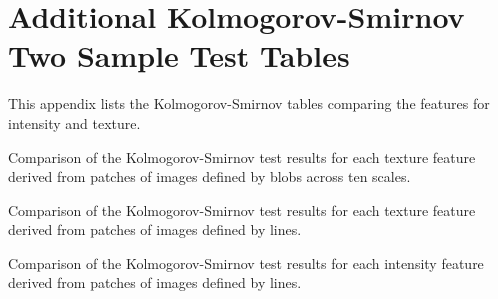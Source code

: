 \chapter{Additional Kolmogorov-Smirnov Two Sample Test Tables}
\label{appendix:ks-test}
This appendix lists the Kolmogorov-Smirnov tables comparing the features for intensity and texture.

\begin{table}[H]
\label{table:blob-texture-ks}
\centering
{}
\caption{Comparison of the Kolmogorov-Smirnov test results for each texture feature derived from patches of images defined by blobs across ten scales.}
\end{table}



\begin{table}[H]
\label{table:line-texture-ks}
\centering
{}
\caption{Comparison of the Kolmogorov-Smirnov test results for each texture feature derived from patches of images defined by lines.}
\end{table}

\begin{table}[H]
\label{table:line-intensity-ks}
\centering
{}
\caption{Comparison of the Kolmogorov-Smirnov test results for each intensity feature derived from patches of images defined by lines.}
\end{table}